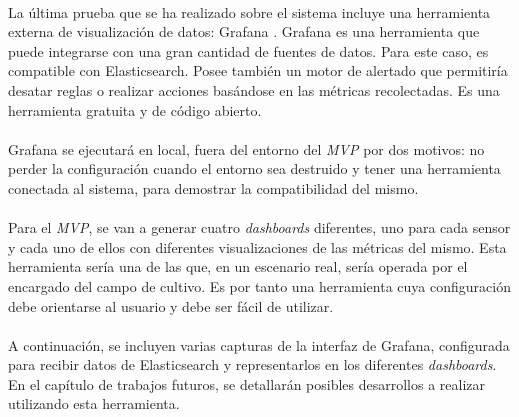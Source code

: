 \documentclass[../../memoria.tex]{subfiles}
\begin{document}
\paragraph{}
La última prueba que se ha realizado sobre el sistema incluye una herramienta externa de visualización de datos: Grafana \cite{grafana}. Grafana es una herramienta que puede integrarse con una gran cantidad de fuentes de datos. Para este caso, es compatible con Elasticsearch. Posee también un motor de alertado que permitiría desatar reglas o realizar acciones basándose en las métricas recolectadas. Es una herramienta gratuita y de código abierto.

\paragraph{}
Grafana se ejecutará en local, fuera del entorno del \textit{MVP} por dos motivos: no perder la configuración cuando el entorno sea destruido y tener una herramienta conectada al sistema, para demostrar la compatibilidad del mismo.

\paragraph{}
Para el \textit{MVP}, se van a generar cuatro \textit{dashboards} diferentes, uno para cada sensor y cada uno de ellos con diferentes visualizaciones de las métricas del mismo. Esta herramienta sería una de las que, en un escenario real, sería operada por el encargado del campo de cultivo. Es por tanto una herramienta cuya configuración debe orientarse al usuario y debe ser fácil de utilizar.

\paragraph{}
A continuación, se incluyen varias capturas de la interfaz de Grafana, configurada para recibir datos de Elasticsearch y representarlos en los diferentes \textit{dashboards}. En el capítulo de trabajos futuros, se detallarán posibles desarrollos a realizar utilizando esta herramienta.
\end{document}
